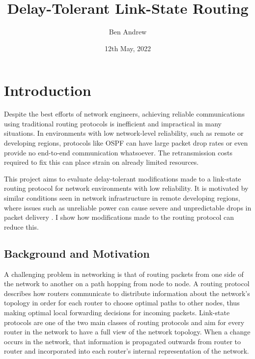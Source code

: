 \documentclass[withindex,glossary,openany]{cam-thesis}
\title{Delay-Tolerant Link-State Routing}
\author{Ben Andrew}
\date{12th May, 2022}
\begin{document}
\frontmatter{}






\chapter{Introduction}


Despite the best efforts of network engineers, achieving reliable communications using traditional routing protocols is inefficient and impractical in many situations. In environments with low network-level reliability, such as remote or developing regions, protocols like OSPF can have large packet drop rates or even provide no end-to-end communication whatsoever. The retransmission costs required to fix this can place strain on already limited resources.

This project aims to evaluate delay-tolerant modifications made to a link-state routing protocol for network environments with low reliability. It is motivated by similar conditions seen in network infrastructure in remote developing regions, where issues such as unreliable power can cause severe and unpredictable drops in packet delivery \cite{DEMMER2007}. I show how modifications made to the routing protocol can reduce this.


\section{Background and Motivation}

A challenging problem in networking is that of routing packets from one side of the network to another on a path hopping from node to node. A routing protocol describes how routers communicate to distribute information about the network's topology in order for each router to choose optimal paths to other nodes, thus making optimal local forwarding decisions for incoming packets. Link-state protocols \cite{LSR_PROTOCOL} are one of the two main classes of routing protocols and aim for every router in the network to have a full view of the network topology. When a change occurs in the network, that information is propagated outwards from router to router and incorporated into each router's internal representation of the network.
\end{document}
